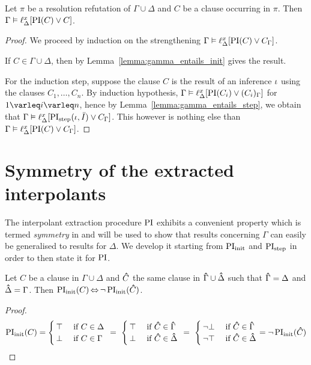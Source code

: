 \begin{lemma}
	\label{lemma:gamma_entails_lifted_interpolant}
	Let $\pi$ be a resolution refutation of $\Gamma \cup \Delta$ and $C$ be a clause occurring in $\pi$.
	Then $\Gamma \entails \lifdelta{\PI(C) \lor\nolinebreak C}$.
\end{lemma}
\begin{proof}
	We proceed by induction on the strengthening
	$\Gamma \entails \lifdelta{\PI(C) \lor\nolinebreak C_\Gamma}$.

	If $C \in \Gamma\cup\Delta$, then by Lemma~\ref{lemma:gamma_entails_init} gives the result.

	For the induction step, suppose the clause $C$ is the result of an inference $\iota$ using the clauses $C_1, \dots, C_n$.
	By induction hypothesis, $\Gamma \entails \lifdelta{\PI(C_i) \lor\nolinebreak (C_i)_\Gamma}$ for $1\varleq i\varleq n$, hence
	by Lemma~\ref{lemma:gamma_entails_step}, we obtain that 
	$\Gamma \vDash \ell_{\Delta}^{x}[\operatorname{PI}_{\mathrm{step}}(\iota, \bar I) \lor C_\Gamma]$.
	This however is nothing else than $\Gamma \vDash \ell_{\Delta}^{x}[\operatorname{PI}(C) \lor C_\Gamma]$.
\end{proof}




\section{Symmetry of the extracted interpolants}
\label{sec:symmetry}

The interpolant extraction procedure $\operatorname{PI}$ exhibits a convenient property which is termed \emph{symmetry} in \cite[Definition 3]{interpolantStrenth} and will be used to show that results concerning $\Gamma$ can easily be generalised to results for $\Delta$.
We develop it starting from $\operatorname{PI}_{\mathrm{init}}$ and $\operatorname{PI}_{\mathrm{step}}$ in order to then state it for $\operatorname{PI}$. 

\newcommand{\primex}[1]{\ensuremath{\bhat{#1}}}

\begin{lemma}
	\label{lemma:symmetry_base}
	Let $C$ be a clause in $\Gamma \cup \Delta$ and $\primex C$ the same clause in $\primex\Gamma\cup \primex\Delta$ such that $\primex\Gamma = \Delta$ and $\primex\Delta = \Gamma$.
	Then $\PIinit(C) \semiff \lnot \PIinit(\primex C)$. 
\end{lemma}
\begin{proof}
	\[
		\PIinit(C) =
	\begin{cases} \top & \text{ if $C \in \Delta$} \\ \bot & \text{ if $C \in \Gamma$}\end{cases}
	\spam= \begin{cases} \top & \text{ if $\primex C \in \primex\Gamma$} \\ \bot & \text{ if $\primex C \in \primex\Delta$}\end{cases}\\
		\spam =
	 \begin{cases} \lnot \bot & \text{ if $\primex C \in \primex\Gamma$} \\ \lnot \top & \text{ if $\primex C \in \primex\Delta$}\end{cases}
		=
		\lnot \PIinit(\primex C) 
		\qedhere
	\]
\end{proof}

